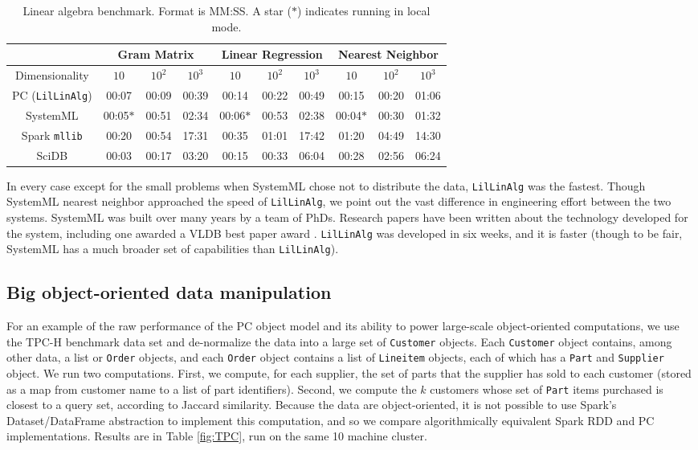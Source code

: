 \begin{table}[h!]
\begin{center}
\begin{tabular}{|c||c|c|c||c|c|c||c|c|c||}
\hline
& \multicolumn{3}{c||}{Gram Matrix} & \multicolumn{3}{c||}{Linear Regression} & \multicolumn{3}{c||}{Nearest Neighbor} \\
\hline
Dimensionality & $10$ & $10^2$ & $10^3$& $10$ & $10^2$ & $10^3$& $10$ & $10^2$ & $10^3$ \\
\hline
\hline
PC (\texttt{LilLinAlg}) &00:07 & 00:09 &00:39 &00:14 &00:22 &00:49& 00:15 & 00:20 & 01:06 \\
SystemML &00:05$*$ &00:51 &02:34 &00:06$*$ &00:53 &02:38 &00:04$*$ &00:30 &01:32 \\
Spark \texttt{mllib} &00:20  &00:54 &17:31 &00:35 &01:01 &17:42 &01:20 & 04:49 &14:30 \\
SciDB   &00:03 &00:17 &03:20 &00:15 &00:33 &06:04 &00:28 &02:56 & 06:24 \\
\hline
\end{tabular}
\caption{Linear algebra benchmark. Format is MM:SS.
A star ($*$) indicates running in local mode.}
\label{fig:LR}
\end{center}
\end{table}

In every case except for the small problems when SystemML chose not to distribute the data,
\texttt{LilLinAlg} was the fastest.  
Though SystemML nearest neighbor approached the speed of 
\texttt{LilLinAlg}, we point out the vast difference in engineering effort between the two systems.  
SystemML was built over many years by a team of PhDs. Research papers have been written about the
technology developed for the system, including one awarded a VLDB best paper award \cite{boehm2016systemml}.
\texttt{LilLinAlg} was developed in six weeks, and it is faster (though to be fair, SystemML has a much broader
set of capabilities than \texttt{LilLinAlg}).

\subsection{Big object-oriented data manipulation}
For an example of the raw performance of the PC object model and its ability to power large-scale 
object-oriented computations, we use the TPC-H benchmark data set \cite{council2008tpc}
and de-normalize
the data into a large set of \texttt{Customer} objects. Each
\texttt{Customer} object contains, among
other data, a list
or \texttt{Order} objects, and each \texttt{Order} object contains a list of \texttt{Lineitem} objects,
each of which has a \texttt{Part} and \texttt{Supplier} object.  
We run two computations. First, we compute, for each supplier,
the set of parts that the supplier has sold to each customer (stored
as a map from customer name to a list of part identifiers).
Second, we compute the $k$ customers whose set of \texttt{Part} items purchased is closest to
a query set, according to Jaccard similarity.
Because the data are object-oriented, it
is not possible to use Spark's Dataset/DataFrame abstraction to implement this computation, and so
we compare algorithmically equivalent Spark RDD and PC implementations.
Results are in Table \ref{fig:TPC}, run on the same 10 machine cluster.  


